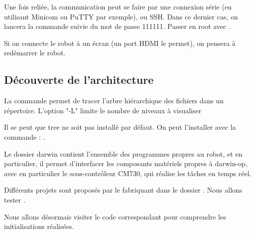 \documentclass[conference]{IEEEtran}
\begin{document}
Une fois reliée, la communication peut se faire par une connexion série (en utilisant Minicom ou PuTTY par exemple), ou SSH. Dans ce dernier cas, on lancera la commande
     suivie du mot de passe 111111.
    Passer en root avec .

Si on connecte le robot à un écran (un port HDMI le permet), on pensera à redémarrer le robot.


\subsection{Découverte de l'architecture}

La commande  permet de tracer l'arbre hiérarchique des fichiers dans un répertoire. L'option "-L" limite le nombre de niveaux à visualiser

Il se peut que tree ne soit pas installé par défaut. On peut l'installer avec la commande : .


Le dossier darwin contient l'ensemble des programmes propres au robot, et en particulier, il permet d'interfacer les composants matériels propres à darwin-op, avec en particulier le sous-contrôleur CM730, qui réalise les tâches en temps réel.

Différents projets sont proposés par le fabriquant dans le dossier . Nous allons tester .



Nous allons désormais visiter le code correspondant pour comprendre les initialisations réalisées.

\end{document}
